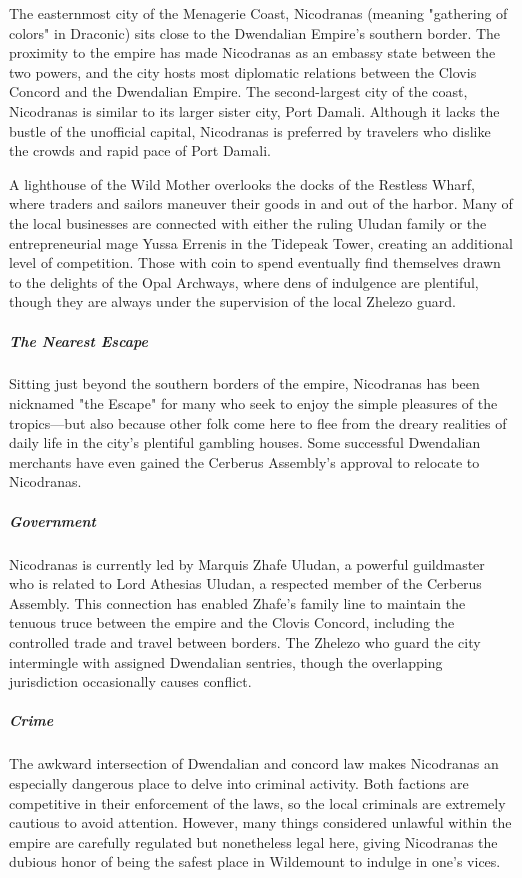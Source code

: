 \documentclass[10pt,a4paper,twoside,bg=print,twocolumn,openany,nodeprecatedcode]{dndbook}
\begin{document}
The easternmost city of the Menagerie Coast, Nicodranas (meaning "gathering of colors" in Draconic) sits close to the Dwendalian Empire's southern border. The proximity to the empire has made Nicodranas as an embassy state between the two powers, and the city hosts most diplomatic relations between the Clovis Concord and the Dwendalian Empire. The second-largest city of the coast, Nicodranas is similar to its larger sister city, Port Damali. Although it lacks the bustle of the unofficial capital, Nicodranas is preferred by travelers who dislike the crowds and rapid pace of Port Damali.

A lighthouse of the Wild Mother overlooks the docks of the Restless Wharf, where traders and sailors maneuver their goods in and out of the harbor. Many of the local businesses are connected with either the ruling Uludan family or the entrepreneurial mage Yussa Errenis in the Tidepeak Tower, creating an additional level of competition. Those with coin to spend eventually find themselves drawn to the delights of the Opal Archways, where dens of indulgence are plentiful, though they are always under the supervision of the local Zhelezo guard.

\subparagraph{The Nearest Escape}
Sitting just beyond the southern borders of the empire, Nicodranas has been nicknamed "the Escape" for many who seek to enjoy the simple pleasures of the tropics—but also because other folk come here to flee from the dreary realities of daily life in the city's plentiful gambling houses. Some successful Dwendalian merchants have even gained the Cerberus Assembly's approval to relocate to Nicodranas.

\subparagraph{Government}
Nicodranas is currently led by Marquis Zhafe Uludan, a powerful guildmaster who is related to Lord Athesias Uludan, a respected member of the Cerberus Assembly. This connection has enabled Zhafe's family line to maintain the tenuous truce between the empire and the Clovis Concord, including the controlled trade and travel between borders. The Zhelezo who guard the city intermingle with assigned Dwendalian sentries, though the overlapping jurisdiction occasionally causes conflict.

\subparagraph{Crime}
The awkward intersection of Dwendalian and concord law makes Nicodranas an especially dangerous place to delve into criminal activity. Both factions are competitive in their enforcement of the laws, so the local criminals are extremely cautious to avoid attention. However, many things considered unlawful within the empire are carefully regulated but nonetheless legal here, giving Nicodranas the dubious honor of being the safest place in Wildemount to indulge in one's vices.
\end{document}
